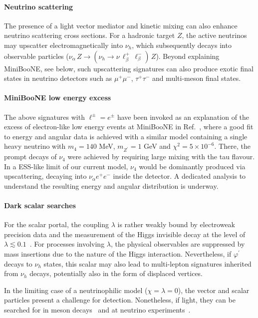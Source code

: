 \paragraph{Neutrino scattering} The presence of a light vector mediator and kinetic mixing can also enhance neutrino scattering cross sections. For a hadronic target $Z$, the active neutrinos may upscatter electromagnetically into $\nu_h$, which subsequently decays into observable particles ($\nu_\alpha \, Z \to (\nu_h \to \nu\, \ell_\beta^+\,\ell_\beta^-)\, Z$). Beyond explaining MiniBooNE, see below, such upscattering signatures can also produce exotic final states in neutrino detectors such as $\mu^+\mu^-$, $\tau^+\tau^-$ and multi-meson final states.


\paragraph{MiniBooNE low energy excess} The above signatures with $\ell^\pm = e^\pm$ have been invoked as an explanation of the excess of electron-like low energy events at MiniBooNE in Ref.~\cite{Ballett:2018ynz}, where a good fit to energy and angular data is achieved with a similar model containing a single heavy neutrino with $m_4 = 140$ MeV, $m_{Z^\prime} = 1$ GeV and $\chi^2 = 5\times10^{-6}$. There, the prompt decays of $\nu_4$ were achieved by requiring large mixing with the tau flavour. In a ESS-like limit of our current model, $\nu_4$ would be dominantly produced via upscattering, decaying into $\nu_\alpha e^+e^-$ inside the detector. A dedicated analysis to understand the resulting energy and angular distribution is underway.

\paragraph{Dark scalar searches}
For the scalar portal, the coupling $\lambda$ is rather weakly bound by electroweak precision data and the measurement of the Higgs invisible decay at the level of $\lambda \lesssim 0.1$~\cite{Sirunyan:2018owy}. For processes involving $\lambda$, the physical observables are suppressed by mass insertions due to the nature of the Higgs interaction. Nevertheless, if $\varphi^\prime$ decays to $\nu_h$ states, this scalar may also lead to multi-lepton signatures inherited from $\nu_h$ decays, potentially also in the form of displaced vertices.

In the limiting case of a neutrinophilic model ($\chi=\lambda=0$), the vector and scalar particles present a challenge for detection. Nonetheless, if light, they can be searched for in meson decays~\cite{Laha:2013xua,Bakhti:2017jhm} and at neutrino experiments~\cite{Bakhti:2018avv}.

